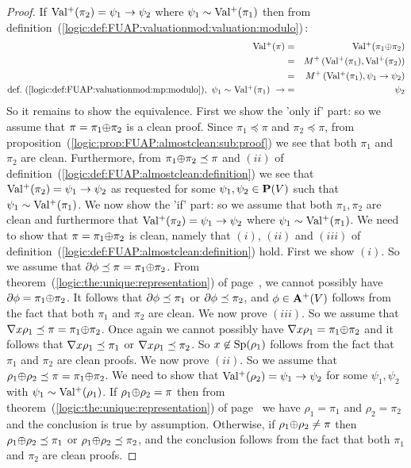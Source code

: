 \begin{proof}
If $\mbox{$\rm Val^{+}$}(\pi_{2})=\psi_{1}\to\psi_{2}$ where
$\psi_{1}\sim\mbox{$\rm Val^{+}$}(\pi_{1})$ then from
definition~(\ref{logic:def:FUAP:valuationmod:valuation:modulo})\,:
    \begin{eqnarray*}
    \mbox{$\rm Val^{+}$}(\pi)&=&\mbox{$\rm Val^{+}$}(\pi_{1}\mbox{$\oplus$}\pi_{2})\\
    &=&M^{+}\,(\mbox{$\rm Val^{+}$}(\pi_{1}), \mbox{$\rm Val^{+}$}(\pi_{2}))\\
    &=&M^{+}\,(\mbox{$\rm Val^{+}$}(\pi_{1}), \psi_{1}\to\psi_{2})\\
    \mbox{def.~(\ref{logic:def:FUAP:valuationmod:mp:modulo})},
    \ \psi_{1}\sim\mbox{$\rm Val^{+}$}(\pi_{1})\ \rightarrow&=&\psi_{2}
    \end{eqnarray*}
So it remains to show the equivalence. First we show the 'only if'
part: so we assume that $\pi=\pi_{1}\mbox{$\oplus$}\pi_{2}$ is a clean proof.
Since $\pi_{1}\preceq\pi$ and $\pi_{2}\preceq\pi$, from
proposition~(\ref{logic:prop:FUAP:almostclean:sub:proof}) we see
that both $\pi_{1}$ and $\pi_{2}$ are clean. Furthermore, from
$\pi_{1}\mbox{$\oplus$}\pi_{2}\preceq\pi$ and $(ii)$ of
definition~(\ref{logic:def:FUAP:almostclean:definition}) we see that
$\mbox{$\rm Val^{+}$}(\pi_{2})=\psi_{1}\to\psi_{2}$ as requested for some
$\psi_{1},\psi_{2}\in\mbox{${\bf P}(V)$}$ such that $\psi_{1}\sim\mbox{$\rm Val^{+}$}(\pi_{1})$. We
now show the 'if' part: so we assume that both $\pi_{1},\pi_{2}$ are
clean and furthermore that $\mbox{$\rm Val^{+}$}(\pi_{2})=\psi_{1}\to\psi_{2}$
where $\psi_{1}\sim\mbox{$\rm Val^{+}$}(\pi_{1})$. We need to show that
$\pi=\pi_{1}\mbox{$\oplus$}\pi_{2}$ is clean, namely that $(i)$, $(ii)$ and
$(iii)$ of definition~(\ref{logic:def:FUAP:almostclean:definition})
hold. First we show $(i)$. So we assume that
$\mbox{$\partial$}\phi\preceq\pi=\pi_{1}\mbox{$\oplus$}\pi_{2}$. From
theorem~(\ref{logic:the:unique:representation}) of
page~\pageref{logic:the:unique:representation}, we cannot possibly
have $\mbox{$\partial$}\phi=\pi_{1}\mbox{$\oplus$}\pi_{2}$. It follows that
$\mbox{$\partial$}\phi\preceq\pi_{1}$ or $\mbox{$\partial$}\phi\preceq\pi_{2}$, and
$\phi\in\mbox{${\bf A}^{+}(V)$}$ follows from the fact that both $\pi_{1}$ and
$\pi_{2}$ are clean. We now prove $(iii)$. So we assume that $\mbox{$\nabla$}
x\rho_{1}\preceq\pi=\pi_{1}\mbox{$\oplus$}\pi_{2}$. Once again we cannot
possibly have $\mbox{$\nabla$} x\rho_{1}=\pi_{1}\mbox{$\oplus$}\pi_{2}$ and it follows
that $\mbox{$\nabla$} x\rho_{1}\preceq\pi_{1}$ or $\mbox{$\nabla$}
x\rho_{1}\preceq\pi_{2}$. So $x\not\in\mbox{\rm Sp}(\rho_{1})$ follows from
the fact that $\pi_{1}$ and $\pi_{2}$ are clean proofs. We now prove
$(ii)$. So we assume that
$\rho_{1}\mbox{$\oplus$}\rho_{2}\preceq\pi=\pi_{1}\mbox{$\oplus$}\pi_{2}$. We need to show
that $\mbox{$\rm Val^{+}$}(\rho_{2})=\psi_{1}\to\psi_{2}$ for some
$\psi_{1},\psi_{2}$ with $\psi_{1}\sim\mbox{$\rm Val^{+}$}(\rho_{1})$. If
$\rho_{1}\mbox{$\oplus$}\rho_{2}=\pi$ then from
theorem~(\ref{logic:the:unique:representation}) of
page~\pageref{logic:the:unique:representation} we have
$\rho_{1}=\pi_{1}$ and $\rho_{2}=\pi_{2}$ and the conclusion is true
by assumption. Otherwise, if $\rho_{1}\mbox{$\oplus$}\rho_{2}\neq\pi$ then
$\rho_{1}\mbox{$\oplus$}\rho_{2}\preceq\pi_{1}$ or
$\rho_{1}\mbox{$\oplus$}\rho_{2}\preceq\pi_{2}$, and the conclusion follows
from the fact that both $\pi_{1}$ and $\pi_{2}$ are clean proofs.
\end{proof}

